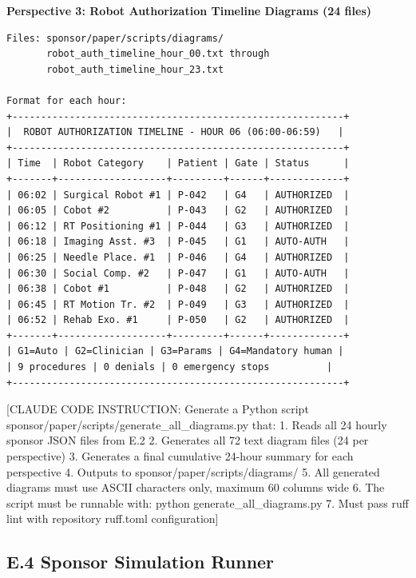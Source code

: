 \textbf{Perspective 3: Robot Authorization Timeline Diagrams (24 files)}

\begin{verbatim}
Files: sponsor/paper/scripts/diagrams/
       robot_auth_timeline_hour_00.txt through
       robot_auth_timeline_hour_23.txt

Format for each hour:
+----------------------------------------------------------+
|  ROBOT AUTHORIZATION TIMELINE - HOUR 06 (06:00-06:59)   |
+----------------------------------------------------------+
| Time  | Robot Category    | Patient | Gate | Status      |
+-------+-------------------+---------+------+-------------+
| 06:02 | Surgical Robot #1 | P-042   | G4   | AUTHORIZED  |
| 06:05 | Cobot #2          | P-043   | G2   | AUTHORIZED  |
| 06:12 | RT Positioning #1 | P-044   | G3   | AUTHORIZED  |
| 06:18 | Imaging Asst. #3  | P-045   | G1   | AUTO-AUTH   |
| 06:25 | Needle Place. #1  | P-046   | G4   | AUTHORIZED  |
| 06:30 | Social Comp. #2   | P-047   | G1   | AUTO-AUTH   |
| 06:38 | Cobot #1          | P-048   | G2   | AUTHORIZED  |
| 06:45 | RT Motion Tr. #2  | P-049   | G3   | AUTHORIZED  |
| 06:52 | Rehab Exo. #1     | P-050   | G2   | AUTHORIZED  |
+-------+-------------------+---------+------+-------------+
| G1=Auto | G2=Clinician | G3=Params | G4=Mandatory human |
| 9 procedures | 0 denials | 0 emergency stops          |
+----------------------------------------------------------+
\end{verbatim}

[CLAUDE CODE INSTRUCTION: Generate a Python script
sponsor/paper/scripts/generate\_all\_diagrams.py that:
1. Reads all 24 hourly sponsor JSON files from E.2
2. Generates all 72 text diagram files (24 per perspective)
3. Generates a final cumulative 24-hour summary for each perspective
4. Outputs to sponsor/paper/scripts/diagrams/
5. All generated diagrams must use ASCII characters only, maximum 60 columns wide
6. The script must be runnable with: python generate\_all\_diagrams.py
7. Must pass ruff lint with repository ruff.toml configuration]

\subsection*{E.4 Sponsor Simulation Runner}

